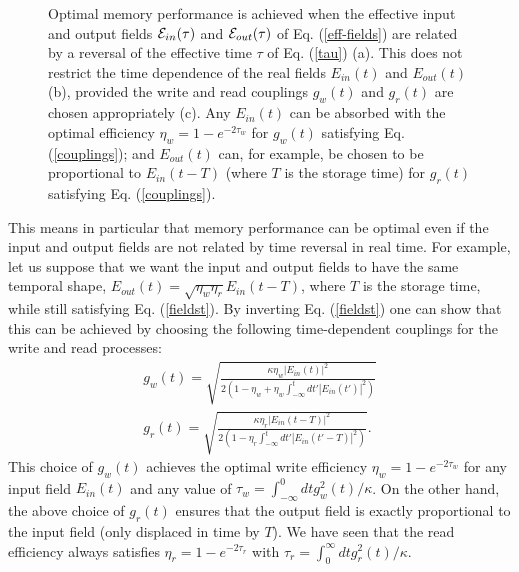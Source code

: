 \documentclass[aps,prl,twocolumn]{revtex4}
\begin{document}
\begin{figure}
\caption{Optimal memory performance is achieved when the effective input and output fields ${\cal E}_{in}(\tau)$ and ${\cal E}_{out}(\tau)$ of Eq. (\ref{eff-fields}) are related by a reversal of the effective time $\tau$ of Eq. (\ref{tau}) (a). This does not restrict the time dependence of the real fields $E_{in}(t)$ and $E_{out}(t)$ (b), provided the write and read couplings $g_w(t)$ and $g_r(t)$ are chosen appropriately (c). Any $E_{in}(t)$ can be absorbed with the optimal efficiency $\eta_w=1-e^{-2\tau_w}$ for $g_w(t)$ satisfying Eq. (\ref{couplings}); and $E_{out}(t)$ can, for example, be chosen to be proportional to $E_{in}(t-T)$ (where $T$ is the storage time) for $g_r(t)$ satisfying Eq. (\ref{couplings}).} \label{levels}
\end{figure}

This means in particular that memory performance can be optimal even if the input and output fields are not related by time reversal in real time. For example, let us suppose that we want the input and output fields to have the same temporal shape, $E_{out}(t)=\sqrt{\eta_w \eta_r} E_{in}(t-T)$, where $T$ is the storage time, while still satisfying Eq. (\ref{fieldst}). By inverting Eq. (\ref{fieldst}) one can show that this can be achieved by choosing the following time-dependent couplings for the write and read processes:
\begin{eqnarray}
g_w(t)=\sqrt{\frac{\kappa \eta_w |E_{in}(t)|^2}{2(1-\eta_w+\eta_w \int_{-\infty}^t dt'|E_{in}(t')|^2)}} \nonumber\\
g_r(t)=\sqrt{\frac{\kappa \eta_r |E_{in}(t-T)|^2}{2(1-\eta_r \int_{-\infty}^t dt'|E_{in}(t'-T)|^2)}} \label{couplings}.
\end{eqnarray}
This choice of $g_w(t)$ achieves the optimal write efficiency $\eta_w=1-e^{-2\tau_w}$ for any input field $E_{in}(t)$ and any value of $\tau_w=\int_{-\infty}^0 dt g_w^2(t)/\kappa$. On the other hand, the above choice of $g_r(t)$ ensures that the output field is exactly proportional to the input field (only displaced in time by $T$). We have seen that the read efficiency always satisfies
 $\eta_r=1-e^{-2\tau_r}$ with $\tau_r=\int_0^{\infty} dt g_r^2(t)/\kappa$.
\end{document}

